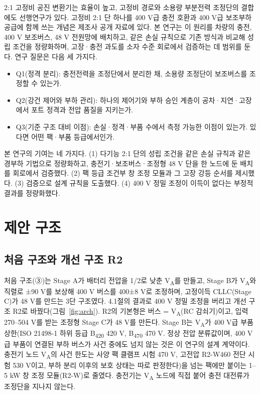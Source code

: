 \documentclass[10pt,a4paper,twocolumn]{article}
\begin{document}
2:1 고정비 공진 변환기는 효율이 높고\cite{r6}, 고정비 경로와 소용량 부분전력 조정단의 결합에도 선행연구가 있다\cite{r7,r8}. 고정비 2:1 단 하나를 400 V급 충전 호환과 400 V급 보조부하 공급에 함께 쓰는 개념은 제조사 공개 자료에 있다\cite{r9}. 본 연구는 이 원리를 차량의 충전, 400 V 보조버스, 48 V 전원망에 배치하고, 같은 손실 규칙으로 기존 방식과 비교해 성립 조건을 정량화하며, 고장·충전 과도를 소자 수준 회로에서 검증하는 데 범위를 둔다. 연구 질문은 다음 세 가지다.

\begin{itemize}
\item Q1(정격 분리): 충전전력을 조정단에서 분리한 채, 소용량 조정단이 보조버스를 조정할 수 있는가.
\item Q2(강건 제어와 부하 관리): 하나의 제어기와 부하 승인 계층이 공차·지연·고장에서 포트 정격과 전압 품질을 지키는가.
\item Q3(기준 구조 대비 이점): 손실·정격·부품 수에서 측정 가능한 이점이 있는가. 있다면 어떤 팩·부품 등급에서인가.
\end{itemize}

본 연구의 기여는 네 가지다. (1) 다기능 2:1 단의 성립 조건을 같은 손실 규칙과 같은 경부하 기법으로 정량화하고, 충전기·보조버스·조정형 48 V 단을 한 노드에 둔 배치를 회로에서 검증했다. (2) 팩 등급 조건부 창 조정 모듈과 그 고장 강등 순서를 제시했다. (3) 검증으로 설계 규칙을 도출했다. (4) 400 V 정밀 조정이 이득이 없다는 부정적 결과를 정량화했다.

\section{제안 구조}

\subsection{처음 구조와 개선 구조 R2}
처음 구조(③)는 Stage A가 배터리 전압을 1/2로 낮춘 V\textsubscript{A}를 만들고, Stage B가 V\textsubscript{A}와 직렬로 ±90 V를 보상해 400 V 버스를 400±8 V로 조정하며, 고정이득 CLLC(Stage C)가 48 V를 만드는 3단 구조였다. 4.1절의 결과로 400 V 정밀 조정을 버리고 개선 구조 R2로 바꿨다(그림~\ref{fig:arch}). R2의 기본형은 버스 = V\textsubscript{A}(RC 감쇠기)이고, 입력 270–504 V를 받는 조정형 Stage C가 48 V를 만든다. Stage B는 V\textsubscript{A}가 400 V급 부품 상한(ISO 21498-1 하위 등급 B\textsubscript{420} 420 V, B\textsubscript{470} 470 V\cite{r10}. 정상 전압 분류값이며, 400 V급 부품이 연결된 부하 버스가 사건 중에도 넘지 않는 것은 이 연구의 설계 계약이다. 충전기 노드 V\textsubscript{A}의 사건 한도는 사양 팩 클램프 시험 470 V, 고전압 R2-W460 전단 시험 530 V이고, 부하 분리 이후의 보호 상태는 따로 판정한다)을 넘는 팩에만 붙이는 1–5 kW 창 조정 모듈(R2-W)로 줄였다. 충전기는 V\textsubscript{A} 노드에 직접 붙어 충전 대전류가 조정단을 지나지 않는다.
\end{document}
